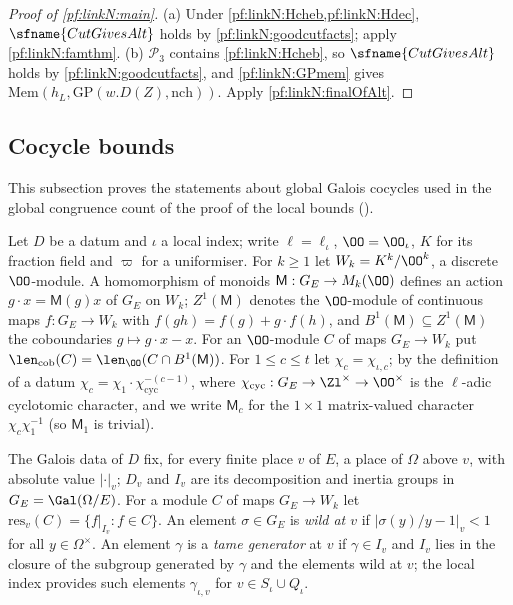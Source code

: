 \begin{proof}[Proof of \cref{pf:linkN:main}]
(a) Under \cref{pf:linkN:Hcheb,pf:linkN:Hdec}, $\sfname{CutGivesAlt}$ holds by \cref{pf:linkN:goodcutfacts}; apply
\cref{pf:linkN:famthm}.
(b) $\mathcal P_3$ contains \cref{pf:linkN:Hcheb}, so $\sfname{CutGivesAlt}$ holds by \cref{pf:linkN:goodcutfacts}, and
\cref{pf:linkN:GPmem} gives $\mathrm{Mem}(h_L,\mathrm{GP}(w.D(Z),\mathrm{nch}))$. Apply \cref{pf:linkN:finalOfAlt}.
\end{proof}

\subsection{Cocycle bounds}\label{sec:pf:linkN:cocycles}

This subsection proves the statements about global Galois cocycles used in the global congruence count of the proof of the
local bounds ().

\begin{definition}[Notation]\label{pf:linkN:cocnot}
Let $D$ be a datum and $\iota$ a local index; write $\ell=\ell_\iota$, $\OO=\OO_\iota$, $K$ for its fraction field and $\varpi$ for a
uniformiser. For $k\ge1$ let $W_k=K^k/\OO^k$, a discrete $\OO$-module. A homomorphism of monoids $\mathsf M:G_E\to M_k(\OO)$ defines an
action $g\cdot x=\mathsf M(g)x$ of $G_E$ on $W_k$; $Z^1(\mathsf M)$ denotes the $\OO$-module of continuous maps $f:G_E\to W_k$ with
$f(gh)=f(g)+g\cdot f(h)$, and $B^1(\mathsf M)\subseteq Z^1(\mathsf M)$ the coboundaries $g\mapsto g\cdot x-x$. For an $\OO$-module $C$ of maps
$G_E\to W_k$ put $\len_{\mathrm{cob}}(C)=\len_\OO(C\cap B^1(\mathsf M))$. For $1\le c\le t$ let $\chi_c=\chi_{\iota,c}$; by the definition of a datum
$\chi_c=\chi_1\cdot\chi_{\mathrm{cyc}}^{-(c-1)}$, where $\chi_{\mathrm{cyc}}:G_E\to\Zl^\times\to\OO^\times$ is the $\ell$-adic cyclotomic character, and
we write $\mathsf M_c$ for the $1\times1$ matrix-valued character $\chi_c\chi_1^{-1}$ (so $\mathsf M_1$ is trivial).

The Galois data of $D$ fix, for every finite place $v$ of $E$, a place of $\Omega$ above $v$, with absolute value $|\cdot|_v$; $D_v$ and $I_v$ are
its decomposition and inertia groups in $G_E=\Gal(\Omega/E)$. For a module $C$ of maps $G_E\to W_k$ let $\mathrm{res}_v(C)=\{f|_{I_v}:f\in C\}$.
An element $\sigma\in G_E$ is \emph{wild at $v$} if $|\sigma(y)/y-1|_v<1$ for all $y\in\Omega^\times$. An element $\gamma$ is a \emph{tame generator}
at $v$ if $\gamma\in I_v$ and $I_v$ lies in the closure of the subgroup generated by $\gamma$ and the elements wild at $v$; the local index
provides such elements $\gamma_{\iota,v}$ for $v\in S_\iota\cup Q_\iota$.
\end{definition}

